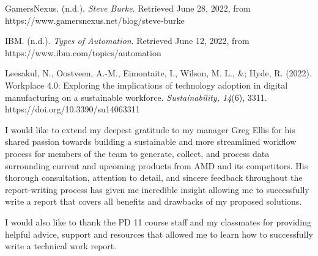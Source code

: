 \documentclass[12pt]{article}
\begin{document}
GamersNexus. (n.d.). \emph{Steve Burke}. Retrieved June 28, 2022, from \\
\indent\hspace{0.5in} https://www.gamersnexus.net/blog/steve-burke

IBM. (n.d.). \emph{Types of Automation}. Retrieved June 12, 2022, from \\
\indent\hspace{0.5in} https://www.ibm.com/topics/automation

Leesakul, N., Oostveen, A.-M., Eimontaite, I., Wilson, M. L., \&; Hyde, R. (2022). \\
\indent\hspace{0.5in} Workplace 4.0: Exploring the implications of technology adoption in digital \\
\indent\hspace{0.5in} manufacturing on a sustainable workforce. \emph{Sustainability, 14}(6), 3311. \\
\indent\hspace{0.5in} https://doi.org/10.3390/su14063311 






\indent\hspace{0.5in} I would like to extend my deepest gratitude to my manager Greg Ellis for his shared passion towards building a sustainable and more streamlined workflow process for members of the team to generate, collect, and process data surrounding current and upcoming products from AMD and its competitors. His thorough consultation, attention to detail, and sincere feedback throughout the report-writing process has given me incredible insight allowing me to successfully write a report that covers all benefits and drawbacks of my proposed solutions.

\indent\hspace{0.5in} I would also like to thank the PD 11 course staff and my classmates for providing helpful advice, support and resources that allowed me to learn how to successfully write a technical work report.
\end{document}
